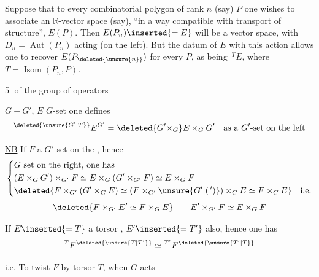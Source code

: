 Suppose that to every combinatorial polygon of rank $n$ (say) $P$ one wishes to associate an $\mathbb{R}$-vector space  (say), ``in a way compatible with transport of structure'',   $E(P)$. Then $E(P_n)\inserted{=E}$ will be a vector space, with $D_n=\operatorname{Aut}(P_n)$ acting (on the left). But the datum of $E$ with this action allows one to recover $E(P_{\deleted{\unsure{n}}})$ for every $P$, as being  $\,{}^TE$, where $T=\operatorname{Isom}(P_n,P)$.

\textcircled{5}  of the group of operators

$G\mathrel{-}G'$, $E$ $G$-set \unsure{,} one defines
\[
 {}^{\deleted{\unsure{G'|T}}}E^{G'}=\deleted{G'\times_G}E\times_G G'
 \quad\text{as a $G'$-set on the left}
\]

\uline{NB} If $F$ a $G'$-set on the , hence
\[
\left\{\begin{aligned}
 &G\text{ set on the right, one has}\\
 &(E\times_G G')\times_{G'}F\simeq E\times_G(G'\times_{G'}F)\simeq E\times_G F\\
 &\deleted{F\times_{G'}(G'\times_G E)\simeq(F\times_{G'}\unsure{G'|(\,')})\times_G E\simeq F\times_G E}\quad\text{i.e.}
\end{aligned}\right.
\]
\[
 \deleted{F\times_{G'}E'\simeq F\times_G E}\qquad E'\times_{G'}F\simeq E\times_G F
\]

If $E\inserted{=T}$ a torsor , $E'\inserted{=T'}$ also, hence one has
\[
 {}^{T}F^{\deleted{\unsure{T|T'}}}\simeq{}^{T'}F^{\deleted{\unsure{T'|T}}}
\]

i.e. To twist $F$ by torsor $T$, when $G$ acts
